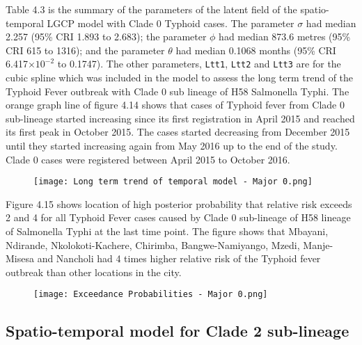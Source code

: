 \documentclass[a4paper]{thesis}
\begin{document}
Table 4.3 is the summary of the parameters of the latent field of the spatio-temporal LGCP model with Clade 0 Typhoid cases. The parameter $\sigma$ had median 2.257 (95\% CRI 1.893 to 2.683); the parameter $\phi$ had median 873.6 metres (95\% CRI 615 to 1316); and the parameter $\theta$ had median 0.1068 months (95\% CRI 6.417$\times10^{-2}$ to 0.1747). The other parameters, \verb=Ltt1=, \verb=Ltt2= and \verb=Ltt3= are for the cubic spline which was included in the model to assess the long term trend of the Typhoid Fever outbreak with Clade 0 sub\- lineage of H58 Salmonella Typhi. The orange graph line of figure 4.14 shows that cases of Typhoid fever from Clade 0 sub-lineage started increasing since its first registration in April 2015 and reached its first peak in October 2015. The cases started decreasing from December 2015 until they started increasing again from May 2016 up to the end of the study. Clade 0 cases were registered between April 2015 to October 2016.

\begin{figure}[H]
\begin{center}
\texttt{[image: Long term trend of temporal model - Major 0.png]}
\end{center}
\end{figure}

Figure 4.15 shows location of high posterior probability  that relative risk exceeds 2 and 4 for all Typhoid Fever cases caused by Clade 0 sub-lineage of H58 lineage of Salmonella Typhi at the last time point. The figure shows that Mbayani, Ndirande, Nkolokoti-Kachere, Chirimba, Bangwe-Namiyango, Mzedi, Manje-Misesa and Nancholi had 4 times higher relative risk of the Typhoid fever outbreak than other locations in the city.

\begin{figure}[H]
\begin{center}
\texttt{[image: Exceedance Probabilities - Major 0.png]}
\end{center}
\end{figure}


\subsection{Spatio-temporal model for Clade 2 sub-lineage}
\end{document}
